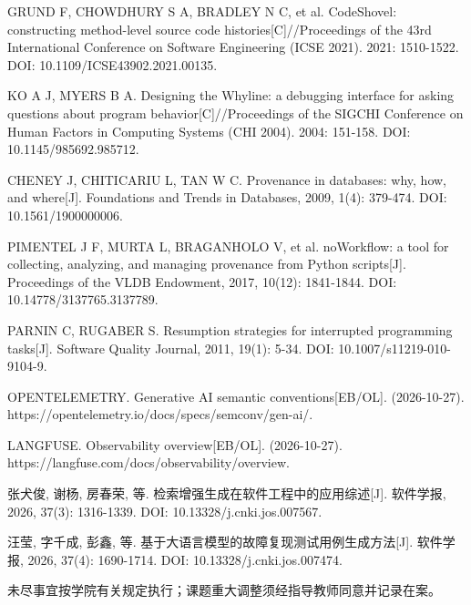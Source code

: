 {\begin{tjreflist}
  \item GRUND F, CHOWDHURY S A, BRADLEY N C, et al. CodeShovel: constructing method-level source code histories[C]//Proceedings of the 43rd International Conference on Software Engineering (ICSE 2021). 2021: 1510-1522. DOI: 10.1109/ICSE43902.2021.00135.
  \item KO A J, MYERS B A. Designing the Whyline: a debugging interface for asking questions about program behavior[C]//Proceedings of the SIGCHI Conference on Human Factors in Computing Systems (CHI 2004). 2004: 151-158. DOI: 10.1145/985692.985712.
  \item CHENEY J, CHITICARIU L, TAN W C. Provenance in databases: why, how, and where[J]. Foundations and Trends in Databases, 2009, 1(4): 379-474. DOI: 10.1561/1900000006.
  \item PIMENTEL J F, MURTA L, BRAGANHOLO V, et al. noWorkflow: a tool for collecting, analyzing, and managing provenance from Python scripts[J]. Proceedings of the VLDB Endowment, 2017, 10(12): 1841-1844. DOI: 10.14778/3137765.3137789.
  \item PARNIN C, RUGABER S. Resumption strategies for interrupted programming tasks[J]. Software Quality Journal, 2011, 19(1): 5-34. DOI: 10.1007/s11219-010-9104-9.
  \item OPENTELEMETRY. Generative AI semantic conventions[EB/OL]. (2026-10-27). https://\allowbreak opentelemetry.io/\allowbreak docs/\allowbreak specs/\allowbreak semconv/\allowbreak gen-ai/\allowbreak .
  \item LANGFUSE. Observability overview[EB/OL]. (2026-10-27). https://\allowbreak langfuse.com/\allowbreak docs/\allowbreak observability/\allowbreak overview.
  \item 张犬俊, 谢杨, 房春荣, 等. 检索增强生成在软件工程中的应用综述[J]. 软件学报, 2026, 37(3): 1316-1339. DOI: 10.13328/j.cnki.jos.007567.
  \item 汪莹, 字千成, 彭鑫, 等. 基于大语言模型的故障复现测试用例生成方法[J]. 软件学报, 2026, 37(4): 1690-1714. DOI: 10.13328/j.cnki.jos.007474.
\end{tjreflist}}

\vfill
{}

未尽事宜按学院有关规定执行；课题重大调整须经指导教师同意并记录在案。


